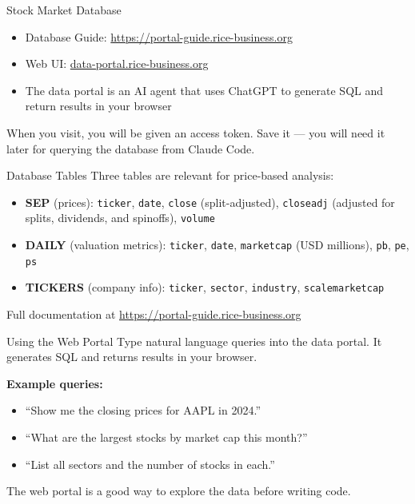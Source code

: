 \documentclass[aspectratio=169,t]{beamer}
\begin{document}
\begin{frame}{Stock Market Database}
\begin{itemize}
\item Database Guide: \url{https://portal-guide.rice-business.org}
\item Web UI: \href{https://data-portal.rice-business.org}{data-portal.rice-business.org}
\item The data portal is an AI agent that uses ChatGPT to generate SQL and return results in your browser
\end{itemize}

\vspace{0.3cm}
When you visit, you will be given an \alert{access token}.  Save it --- you will need it later for querying the database from Claude Code.
\end{frame}

\begin{frame}{Database Tables}
Three tables are relevant for price-based analysis:

\begin{itemize}
\item \textbf{SEP} (prices): \texttt{ticker}, \texttt{date}, \texttt{close} (split-adjusted), \texttt{closeadj} (adjusted for splits, dividends, and spinoffs), \texttt{volume}
\item \textbf{DAILY} (valuation metrics): \texttt{ticker}, \texttt{date}, \texttt{marketcap} (USD millions), \texttt{pb}, \texttt{pe}, \texttt{ps}
\item \textbf{TICKERS} (company info): \texttt{ticker}, \texttt{sector}, \texttt{industry}, \texttt{scalemarketcap}
\end{itemize}

\vspace{0.3cm}
Full documentation at \url{https://portal-guide.rice-business.org}
\end{frame}

\begin{frame}{Using the Web Portal}
Type natural language queries into the data portal.  It generates SQL and returns results in your browser.

\vspace{0.3cm}
\textbf{Example queries:}
\begin{itemize}
\item ``Show me the closing prices for AAPL in 2024.''
\item ``What are the largest stocks by market cap this month?''
\item ``List all sectors and the number of stocks in each.''
\end{itemize}

\vspace{0.3cm}
The web portal is a good way to explore the data before writing code.
\end{frame}
\end{document}
